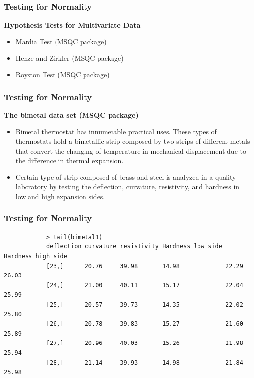 \documentclass{beamer}
\begin{document}
\begin{frame}[fragile]
	\frametitle{Testing for Normality}

	
	\noindent\textbf{Hypothesis Tests for Multivariate Data}
	\begin{itemize}
		\item Mardia Test (MSQC package)
		\item Henze and Zirkler (MSQC package)
		\item Royston Test (MSQC package)
	\end{itemize}
\end{frame}
\begin{frame}[fragile]
	\frametitle{Testing for Normality}
	
	\textbf{The bimetal data set (MSQC package)}
	{\large
		\begin{itemize}
			\item Bimetal thermostat has innumerable practical uses. These types of thermostats hold
			a bimetallic strip composed by two strips of different metals that convert the
			changing of temperature in mechanical displacement due to the difference in
			thermal expansion.
			\item Certain type of strip composed of brass and steel is analyzed in a quality
			laboratory by testing the deflection, curvature, resistivity, and hardness in low
			and high expansion sides.
		\end{itemize}
	}
	\end{frame}

	\begin{frame}[fragile]
		\frametitle{Testing for Normality}
\large
\begin{verbatim}
			> tail(bimetal1)
			deflection curvature resistivity Hardness low side Hardness high side
			[23,]      20.76     39.98       14.98             22.29             26.03
			[24,]      21.00     40.11       15.17             22.04             25.99
			[25,]      20.57     39.73       14.35             22.02             25.80
			[26,]      20.78     39.83       15.27             21.60             25.89
			[27,]      20.96     40.03       15.26             21.98             25.94
			[28,]      21.14     39.93       14.98             21.84             25.98
\end{verbatim}
\end{frame}
\end{document}
